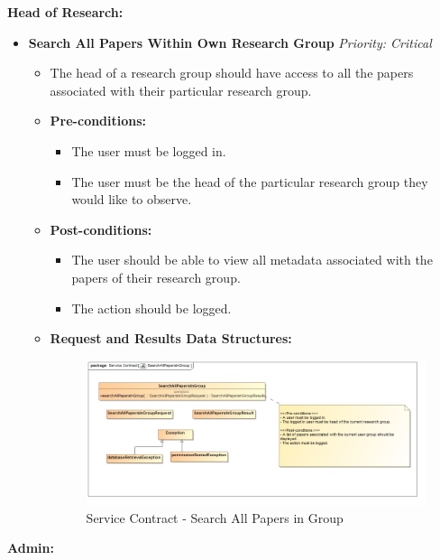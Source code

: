\documentclass{article}
\begin{document}
				\cleardoublepage
				\textbf{Head of Research:}
				
				\begin{itemize}
					\item \textbf{Search All Papers Within Own Research Group} \hfill \textit{Priority: Critical}
					\begin{itemize}
						\item The head of a research group should have access to all the papers associated with their particular research group.
						\item \textbf{Pre-conditions:}
						\begin{itemize}
							\item The user must be logged in.
							\item The user must be the head of the particular research group they would like to observe.
						\end{itemize}
						\item \textbf{Post-conditions:}
						\begin{itemize}
							\item The user should be able to view all metadata associated with the papers of their research group.
							\item The action should be logged.
						\end{itemize}
						\item \textbf{Request and Results Data Structures:}
						\begin{figure}[H]
							\includegraphics[width=\linewidth]{../Diagrams/ServiceContracts/Publication subsystem/SearchAllPapersInGroup.jpg}
							\caption{Service Contract - Search All Papers in Group}
						\end{figure}
					\end{itemize}
				\end{itemize}
				
				\cleardoublepage
				\textbf{Admin:}
				
\end{document}
